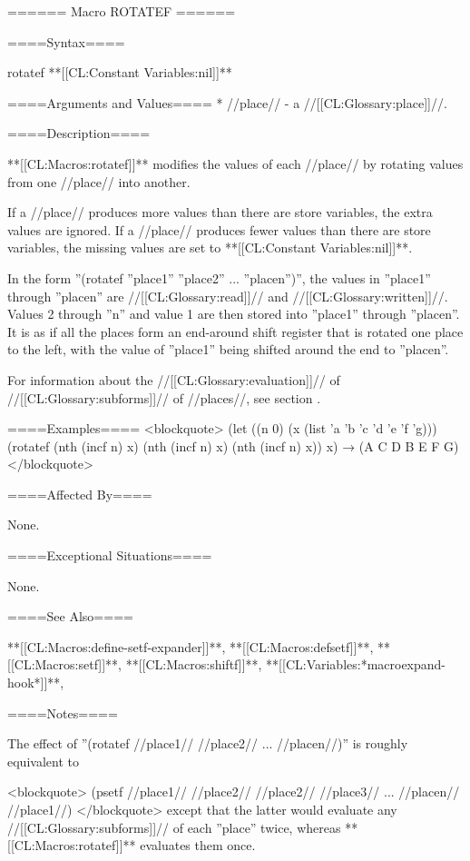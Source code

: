 ====== Macro ROTATEF ======

====Syntax====

\DefmacWithValues rotatef {} {**[[CL:Constant Variables:nil]]**}

====Arguments and Values====
  * //place// - a //[[CL:Glossary:place]]//.

====Description====

**[[CL:Macros:rotatef]]** modifies the values of each //place// by rotating values from one //place// into another.

If a //place// produces more values than there are store variables, the extra values are ignored. If a //place// produces fewer values than there are store variables, the missing values are set to **[[CL:Constant Variables:nil]]**.

In the form ''(rotatef ''place1'' ''place2'' ... ''placen'')'', the values in ''place1'' through ''placen'' are //[[CL:Glossary:read]]// and //[[CL:Glossary:written]]//. Values 2 through ''n'' and value 1 are then stored into ''place1'' through ''placen''. It is as if all the places form an end-around shift register that is rotated one place to the left, with the value of ''place1'' being shifted around the end to ''placen''.

For information about the //[[CL:Glossary:evaluation]]// of //[[CL:Glossary:subforms]]// of //places//, see section {\secref\GenRefSubFormEval}.


====Examples==== <blockquote> (let ((n 0) (x (list 'a 'b 'c 'd 'e 'f 'g))) (rotatef (nth (incf n) x) (nth (incf n) x) (nth (incf n) x)) x) → (A C D B E F G) </blockquote>

====Affected By====

None.

====Exceptional Situations====

None.

====See Also====

**[[CL:Macros:define-setf-expander]]**, **[[CL:Macros:defsetf]]**, **[[CL:Macros:setf]]**, **[[CL:Macros:shiftf]]**, **[[CL:Variables:*macroexpand-hook*]]**, {\secref\GeneralizedReference}

====Notes====

The effect of ''(rotatef //place1// //place2// ... //placen//)'' is roughly equivalent to

<blockquote> (psetf //place1// //place2// //place2// //place3// ... //placen// //place1//) </blockquote> except that the latter would evaluate any //[[CL:Glossary:subforms]]// of each ''place'' twice, whereas **[[CL:Macros:rotatef]]** evaluates them once.

 
